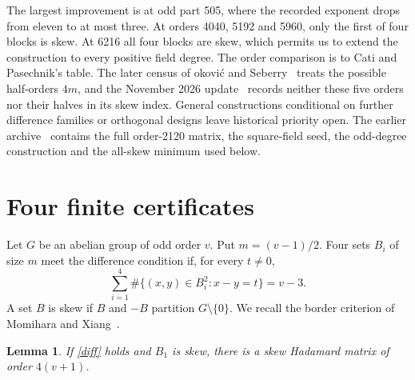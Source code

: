 \documentclass[11pt]{article}
\newtheorem{lemma}[theorem]{Lemma}
\begin{document}
The largest improvement is at odd part 505, where the recorded exponent drops from eleven to at most three. At orders 4040, 5192 and 5960, only the first of four blocks is skew. At 6216 all four blocks are skew, which permits us to extend the construction to every positive field degree. The order comparison is to Cati and Pasechnik's table. The later census of \DJ{}okovi\'c and Seberry~\cite{DS} treats the possible half-orders $4m$, and the November 2026 update~\cite{GSI} records neither these five orders nor their halves in its skew index. General constructions conditional on further difference families or orthogonal designs leave historical priority open. The earlier archive~\cite{Kline} contains the full order-2120 matrix, the square-field seed, the odd-degree construction and the all-skew minimum used below.

\section{Four finite certificates}
Let $G$ be an abelian group of odd order $v$. Put $m=(v-1)/2$. Four sets $B_i$ of size $m$ meet the difference condition if, for every $t\ne0$,
\begin{equation}\label{diff}
\sum_{i=1}^4 \#\{(x,y)\in B_i^2:x-y=t\}=v-3.
\end{equation}
A set $B$ is skew if $B$ and $-B$ partition $G\setminus\{0\}$. We recall the border criterion of Momihara and Xiang~\cite[Prop.~1.3]{MX}.
\begin{lemma}\label{border}
If \eqref{diff} holds and $B_1$ is skew, there is a skew Hadamard matrix of order $4(v+1)$.
\end{lemma}
\end{document}
